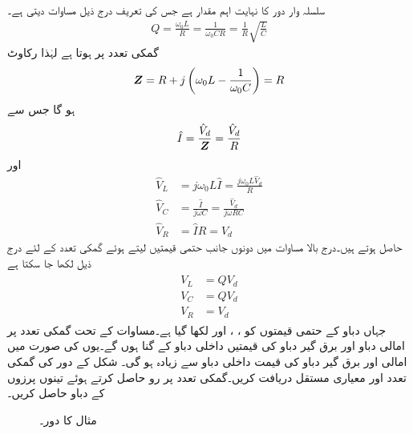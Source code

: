 سلسلہ وار  دور کا   نہایت اہم مقدار ہے جس کی تعریف درج ذیل مساوات دیتی ہے۔
\begin{align}\label{مساوات_تعددی_معیاری_مستقل_تعریف}
Q=\frac{\omega_0 L}{R}=\frac{1}{\omega_0 CR}=\frac{1}{R}\sqrt{\frac{L}{C}}
\end{align}
گمکی تعدد پر  ہوتا ہے لہٰذا رکاوٹ
\begin{align*}
{\ensuremath{{\boldsymbol{Z}}}}=R+j\left(\omega_0 L-\frac{1}{\omega_0 C}\right)=R
\end{align*}
ہو گا جس سے 
\begin{align*}
\hat{I}=\frac{\hat{V}_d}{{{\boldsymbol{Z}}}}=\frac{\hat{V}_d}{R}
\end{align*}
اور
\begin{align*}
\hat{V}_L&=j\omega_0 L \hat{I}=\frac{j\omega_0 L \hat{V}_d}{R}\\
\hat{V}_C&=\frac{\hat{I}}{j\omega C}=\frac{\hat{V}_d}{j\omega R C}\\
\hat{V}_R&=\hat{I} R=\hat{V}_d
\end{align*}
حاصل ہوتے ہیں۔درج بالا مساوات میں دونوں جانب حتمی قیمتیں لیتے ہوئے گمکی تعدد کے لئے درج ذیل لکھا جا سکتا ہے
\begin{gather}
\begin{aligned}\label{مساوات_تعددی_گمکی_دباو_تعلقات}
V_L&=Q V_d\\
V_C&=Q V_d\\
V_R&=V_d
\end{aligned}
\end{gather}
 جہاں دباو کے حتمی قیمتوں کو ، ،   اور  لکھا گیا ہے۔مساوات  کے تحت گمکی تعدد پر امالی دباو اور برق گیر دباو کی قیمتیں داخلی دباو کے  گنا ہوں گے۔یوں  کی صورت میں امالی اور برق گیر دباو کی قیمت داخلی دباو سے زیادہ ہو گی۔ 
شکل  کے دور کی گمکی تعدد اور معیاری مستقل دریافت کریں۔گمکی تعدد پر رو حاصل کرتے ہوئے تینوں پرزوں کے دباو حاصل کریں۔
\begin{figure}
\centering
{}
\caption{مثال  کا دور۔}
\label{شکل_تعددی_سلسلہ_وار_گمکی_تعدد_الف}
\end{figure}


